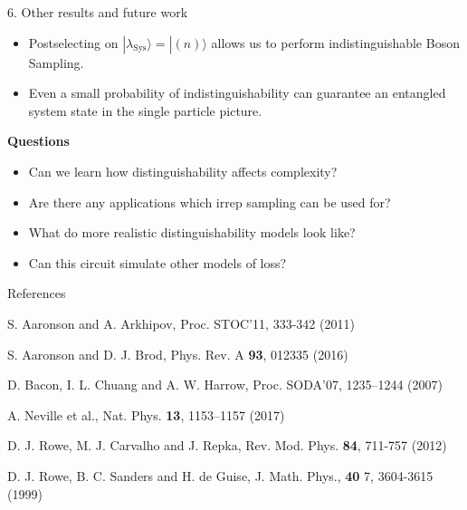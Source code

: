 \documentclass[]{templates/poster}
\begin{document}
\begin{frame}{}
\begin{columns}[t]
\begin{column}{0.422\linewidth}
  \begin{block}{\Large 6. Other results and future work}
  \begin{itemize}
  \item Postselecting on $|\lambda_{\textrm{Sys}}\rangle = |(n)\rangle$ allows us to perform indistinguishable Boson Sampling.
  \item Even a small probability of indistinguishability can guarantee an entangled system state in the single particle picture.
  \end{itemize}
  \textbf{Questions}
  \begin{itemize}
  \item Can we learn how distinguishability affects complexity?
  \item Are there any applications which irrep sampling can be used for?
  \item What do more realistic distinguishability models look like?
  \item Can this circuit simulate other models of loss?
  \end{itemize}
  \end{block}

  \begin{block}{\Large References}
  
  \noindent [AA11] S. Aaronson and A. Arkhipov, Proc. STOC'11, 333-342 (2011)
  
  \noindent [AB16] S. Aaronson and D. J. Brod, Phys. Rev. A \textbf{93}, 012335 (2016)

  
  \noindent [BCH07] D. Bacon, I. L. Chuang and A. W. Harrow, Proc. SODA'07, 1235--1244 (2007)
  
  \noindent [NSC+17] A. Neville et al., Nat. Phys. \textbf{13}, 1153–1157 (2017)
  
  \noindent [RCR12] D. J. Rowe, M. J. Carvalho and J. Repka, Rev. Mod. Phys. \textbf{84}, 711-757 (2012)
   
  \noindent [RSdG99] D. J. Rowe, B. C. Sanders and H. de Guise, J. Math. Phys., \textbf{40} 7, 3604-3615 (1999)
  \end{block}
  \end{column}
\end{columns}

\end{frame}

\end{document}

